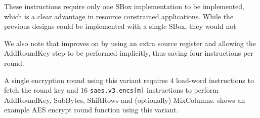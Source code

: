 These instructions require only one SBox implementation to be implemented,
which is a clear advantage in resource constrained applications.
While the previous designs could be implemented with a single SBox, they
would not

We also note that \cite{Saarinen:20} improves on \cite{BBFR:06}
by using an extra source register and allowing the AddRoundKey step to be
performed implicitly, thus saving four instructions per round.

A single encryption round using this variant requires
$4$ load-word instructions to fetch the round key and
$16$ {\tt saes.v3.encs[m]} instructions to perform AddRoundKey,
SubBytes, ShiftRows and (optionally) MixColumns.
 shows an example AES encrypt round function
using this variant.

